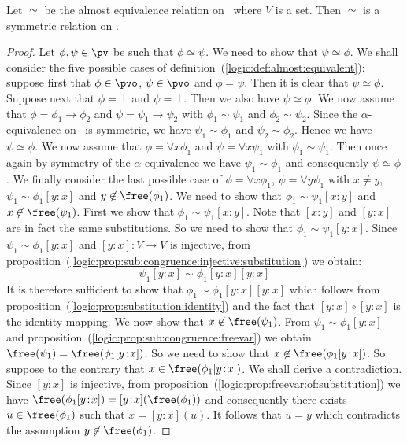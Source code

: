 \begin{prop}\label{logic:prop:almost:symmetric}
Let $\simeq$ be the almost equivalence relation on \pv\ where $V$ is
a set. Then $\simeq$ is a symmetric relation on \pv.
\end{prop}

\noindent
\begin{proof}
Let $\phi,\psi\in\pv$ be such that $\phi\simeq\psi$. We need to show
that $\psi\simeq\phi$. We shall consider the five possible cases of
definition~(\ref{logic:def:almost:equivalent}): suppose first that
$\phi\in\pvo$, $\psi\in\pvo$ and $\phi=\psi$. Then it is clear that
$\psi\simeq\phi$. Suppose next that $\phi=\bot$ and $\psi=\bot$.
Then we also have $\psi\simeq\phi$. We now assume that
$\phi=\phi_{1}\to\phi_{2}$ and $\psi=\psi_{1}\to\psi_{2}$ with
$\phi_{1}\sim\psi_{1}$ and $\phi_{2}\sim\psi_{2}$. Since the 
$\alpha$-equivalence on \pv\ is symmetric, we have
$\psi_{1}\sim\phi_{1}$ and $\psi_{2}\sim\phi_{2}$. Hence we have
$\psi\simeq\phi$. We now assume that $\phi=\forall x\phi_{1}$ and
$\psi=\forall x\psi_{1}$ with $\phi_{1}\sim\psi_{1}$. Then once
again by symmetry of the $\alpha$-equivalence we have
$\psi_{1}\sim\phi_{1}$ and consequently $\psi\simeq\phi$. We finally
consider the last possible case of $\phi=\forall x\phi_{1}$,
$\psi=\forall y\psi_{1}$ with $x\neq y$,
$\psi_{1}\sim\phi_{1}[y\!:\!x]$ and $y\not\in\free(\phi_{1})$. We
need to show that $\phi_{1}\sim\psi_{1}[x\!:\!y]$ and
$x\not\in\free(\psi_{1})$. First we show that
$\phi_{1}\sim\psi_{1}[x\!:\!y]$. Note that $[x\!:\!y]$ and
$[y\!:\!x]$ are in fact the same substitutions. So we need to show
that $\phi_{1}\sim\psi_{1}[y\!:\!x]$. Since
$\psi_{1}\sim\phi_{1}[y\!:\!x]$ and $[y\!:\!x]:V\to V$ is injective,
from
proposition~(\ref{logic:prop:sub:congruence:injective:substitution})
we obtain:
    \[
    \psi_{1}[y\!:\!x]\sim\phi_{1}[y\!:\!x][y\!:\!x]
    \]
It is therefore sufficient to show that
$\phi_{1}\sim\phi_{1}[y\!:\!x][y\!:\!x]$ which follows from
proposition~(\ref{logic:prop:substitution:identity}) and the fact
that $[y\!:\!x]\circ[y\!:\!x]$ is the identity mapping. We now show
that $x\not\in\free(\psi_{1})$. From $\psi_{1}\sim\phi_{1}[y\!:\!x]$
and proposition~(\ref{logic:prop:sub:congruence:freevar}) we obtain
$\free(\psi_{1})=\free(\phi_{1}[y\!:\!x])$. So we need to show that
$x\not\in\free(\phi_{1}[y\!:\!x])$. So suppose to the contrary that
$x\in\free(\phi_{1}[y\!:\!x])$. We shall derive a contradiction.
Since $[y\!:\!x]$ is injective, from
proposition~(\ref{logic:prop:freevar:of:substitution}) we have
$\free(\phi_{1}[y\!:\!x])=[y\!:\!x](\free(\phi_{1}))$ and
consequently there exists $u\in\free(\phi_{1})$ such that
$x=[y\!:\!x](u)$. It follows that $u=y$ which contradicts the
assumption $y\not\in\free(\phi_{1})$.
\end{proof}


